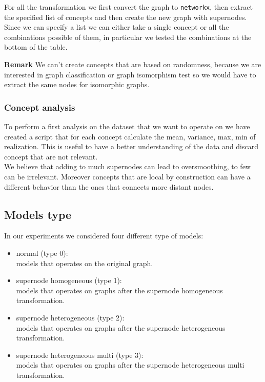 \documentclass[twoside,11pt]{article}
\begin{document}
\noindent
For all the transformation we first convert the graph to \texttt{networkx}, then extract the specified list of concepts and then create the new graph with supernodes. Since we can specify a list we can either take a single concept or all the combinations possible of them, in particular we tested the combinations at the bottom of the table.

\noindent
{\bf Remark}
{
We can't create concepts that are based on randomness, because we are interested in graph classification or graph isomorphism test so we would have to extract the same nodes for isomorphic graphs.
}\\



\subsubsection{Concept analysis} %
\label{sec:concept_analysis}
To perform a first analysis on the dataset that we want to operate on we have created a script that for each concept calculate the mean, variance, max, min of realization. This is useful to have a better understanding of the data and discard concept that are not relevant.\\
We believe that adding to much supernodes can lead to oversmoothing, to few can be irrelevant. Moreover concepts that are local by construction can have a different behavior than the ones that connects more distant nodes.



\subsection{Models type} %
\label{sub:models_type}
In our experiments we considered four different type of models:
\begin{itemize}
    \item normal (type 0): \\
        models that operates on the original graph.
    \item supernode homogeneous (type 1): \\
        models that operates on graphs after the supernode homogeneous transformation.
    \item supernode heterogeneous (type 2): \\
        models that operates on graphs after the supernode heterogeneous transformation.
    \item supernode heterogeneous multi (type 3): \\
        models that operates on graphs after the supernode heterogeneous multi transformation.
\end{itemize}
\end{document}
